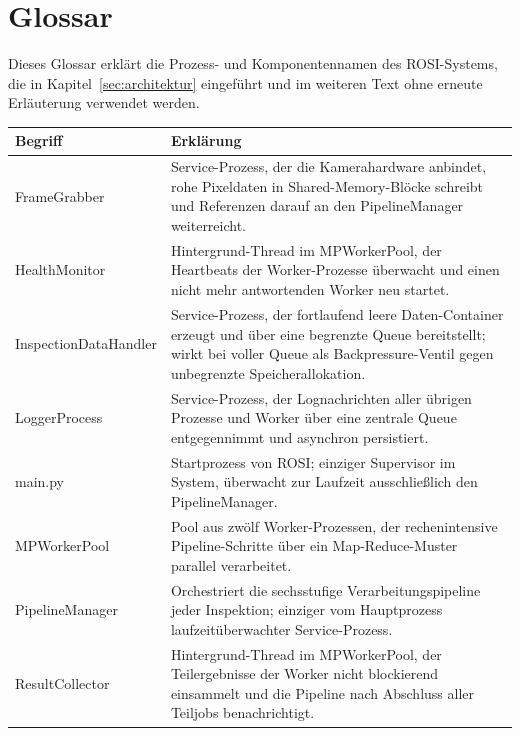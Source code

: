 
\section*{Glossar}
\label{sec:glossar}

Dieses Glossar erklärt die Prozess- und Komponentennamen des ROSI-Systems, die in
Kapitel~\ref{sec:architektur} eingeführt und im weiteren Text ohne erneute Erläuterung
verwendet werden.

\begin{table}[htbp]
    \centering
    \renewcommand{\arraystretch}{1.3}
    \begin{tabularx}{\textwidth}{lX}
        \hline
        \textbf{Begriff} & \textbf{Erklärung} \\
        \hline
        FrameGrabber & Service-Prozess, der die Kamerahardware anbindet, rohe Pixeldaten
        in Shared-Memory-Blöcke schreibt und Referenzen darauf an den PipelineManager
        weiterreicht. \\
        HealthMonitor & Hintergrund-Thread im MPWorkerPool, der Heartbeats der
        Worker-Prozesse überwacht und einen nicht mehr antwortenden Worker neu startet. \\
        InspectionDataHandler & Service-Prozess, der fortlaufend leere Daten-Container
        erzeugt und über eine begrenzte Queue bereitstellt; wirkt bei voller Queue als
        Backpressure-Ventil gegen unbegrenzte Speicherallokation. \\
        LoggerProcess & Service-Prozess, der Lognachrichten aller übrigen Prozesse und
        Worker über eine zentrale Queue entgegennimmt und asynchron persistiert. \\
        main.py & Startprozess von ROSI; einziger Supervisor im System, überwacht zur
        Laufzeit ausschließlich den PipelineManager. \\
        MPWorkerPool & Pool aus zwölf Worker-Prozessen, der rechenintensive
        Pipeline-Schritte über ein Map-Reduce-Muster parallel verarbeitet. \\
        PipelineManager & Orchestriert die sechsstufige Verarbeitungspipeline jeder
        Inspektion; einziger vom Hauptprozess laufzeitüberwachter Service-Prozess. \\
        ResultCollector & Hintergrund-Thread im MPWorkerPool, der Teilergebnisse der
        Worker nicht blockierend einsammelt und die Pipeline nach Abschluss aller
        Teiljobs benachrichtigt. \\
        \hline
    \end{tabularx}
\end{table}
